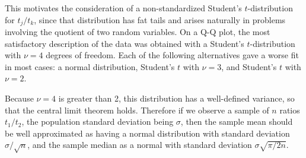 \documentclass[10pt,letterpaper]{article}
\begin{document}
This motivates the consideration of a non-standardized Student's $t$-distribution for $t_j/t_k$, since that
distribution has fat tails and arises naturally in problems involving the quotient of two random variables.
On a Q-Q plot, the most satisfactory description of the data was obtained with a Student's
$t$-distribution with $\nu=4$ degrees of freedom.
Each of the following alternatives gave a worse fit in most cases: a normal distribution,
Student's $t$ with $\nu=3$, and Student's $t$ with $\nu=2$.

Because $\nu=4$ is greater than 2, this distribution has a well-defined variance, so that
the central limit theorem holds. Therefore if we observe a sample of $n$ ratios $t_1/t_2$,
the population standard deviation being $\sigma$, then the sample mean should be well
approximated as having a normal distribution with standard deviation $\sigma/\sqrt{n}$,
and the sample median as a normal with standard deviation $\sigma\sqrt{\pi/2n}$.



\end{document}
